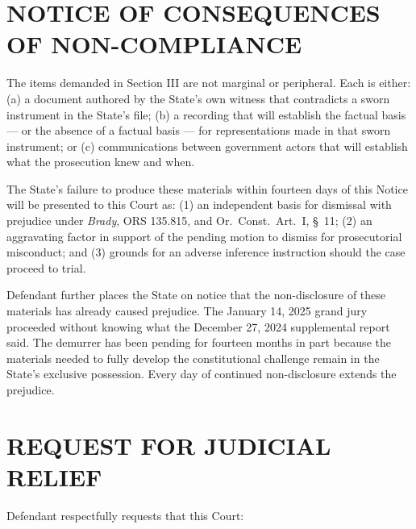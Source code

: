 \documentclass[12pt,letterpaper]{extarticle}
\begin{document}
	\section{NOTICE OF CONSEQUENCES OF NON-COMPLIANCE}
	
	The items demanded in Section III are not marginal or peripheral. Each is either:
	(a) a document authored by the State's own witness that contradicts a sworn
	instrument in the State's file; (b) a recording that will establish the factual
	basis --- or the absence of a factual basis --- for representations made in that
	sworn instrument; or (c) communications between government actors that will
	establish what the prosecution knew and when.
	
	The State's failure to produce these materials within fourteen days of this Notice
	will be presented to this Court as: (1) an independent basis for dismissal with
	prejudice under \textit{Brady}, ORS 135.815, and Or.\ Const.\ Art.\ I, \S~11;
	(2) an aggravating factor in support of the pending motion to dismiss for
	prosecutorial misconduct; and (3) grounds for an adverse inference instruction
	should the case proceed to trial.
	
	Defendant further places the State on notice that the non-disclosure of these
	materials has already caused prejudice. The January 14, 2025 grand jury proceeded
	without knowing what the December 27, 2024 supplemental report said. The demurrer
	has been pending for fourteen months in part because the materials needed to fully
	develop the constitutional challenge remain in the State's exclusive possession.
	Every day of continued non-disclosure extends the prejudice.
	
	\section{REQUEST FOR JUDICIAL RELIEF}
	
	Defendant respectfully requests that this Court:
	
\end{document}
